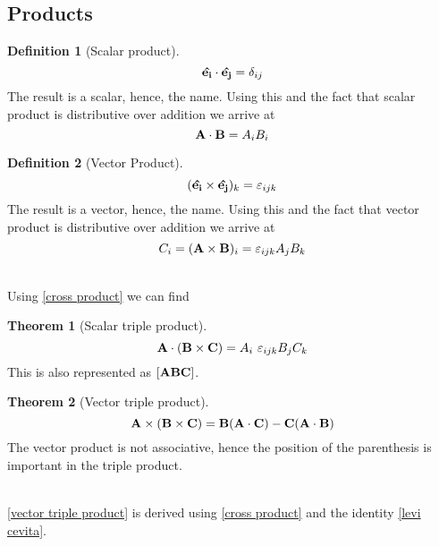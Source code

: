 \documentclass[10pt, a4paper]{extarticle}
\theoremstyle{definition}
\newtheorem{thm}{Theorem}
\newtheorem{defn}{Definition}
\numberwithin{equation}{subsection}
\begin{document}
\subsection{Products}
\begin{framed}
	\begin{defn}[Scalar product]
		\begin{equation}\vu{e_i}\cdot\vu{e_j}=\delta_{ij}\end{equation}
		The result is a scalar, hence, the name. Using this and the fact that scalar product is distributive over addition we arrive at
		\begin{equation}\vb{A}\cdot\vb{B}=A_iB_i\end{equation}
	\end{defn}
	\begin{defn}[Vector Product]
		\begin{equation}(\vu{e_i}\times\vu{e_j})_k=\varepsilon_{ijk}\end{equation}
		The result is a vector, hence, the name. Using this and the fact that vector product is distributive over addition we arrive at
		\begin{equation}\label{cross product}C_i=(\vb{A}\times\vb{B})_i=\varepsilon_{ijk}A_jB_k\end{equation}
	\end{defn}
\end{framed}
\hfill\\
Using \eqref{cross product} we can find
\begin{framed}
	\begin{thm}[Scalar triple product]
		\begin{equation}\vb{A}\cdot(\vb{B}\times\vb{C})=A_i\ \varepsilon_{ijk}B_jC_k\end{equation}
		This is also represented as $[\vb{ABC}]$.
	\end{thm}
	\begin{thm}[Vector triple product]
		\begin{equation}\label{vector triple product}\vb{A}\times(\vb{B}\times\vb{C})=\vb{B}(\vb{A}\cdot\vb{C})-\vb{C}(\vb{A}\cdot\vb{B})\end{equation}
		The vector product is not associative, hence the position of the parenthesis is important in the triple product.
	\end{thm}
\end{framed}
\hfill\\
\eqref{vector triple product} is derived using \eqref{cross product} and the identity \eqref{levi cevita}.
\end{document}
